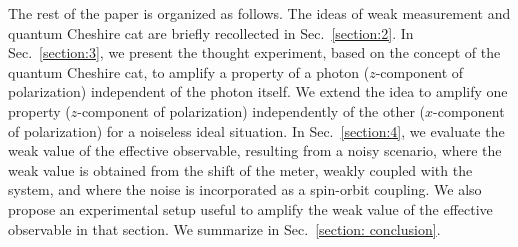 \documentclass[aps,pra,showpacs,twoside,twocolumn,10pt]{revtex4-1}
\begin{document}
\par
The rest of the paper is organized as follows. The ideas of weak measurement and quantum Cheshire cat are briefly recollected  in Sec.~\ref{section:2}. In Sec.~\ref{section:3}, we present the thought experiment, based on the concept of the quantum Cheshire cat, to amplify a property of a photon ($z$-component of polarization) independent of the photon itself. We extend the idea 
to amplify one property ($z$-component of polarization) independently of the other ($x$-component of polarization) for a noiseless ideal situation. 
 In Sec.~\ref{section:4}, we evaluate the weak value of the effective observable, resulting from a noisy scenario, where the weak value is obtained from the shift of the meter, weakly coupled with the system, and where the noise is incorporated as a spin-orbit coupling. We also propose an experimental setup useful to amplify the weak value of the effective observable in that section. %
 We summarize in Sec.~\ref{section: conclusion}. %
\end{document}
